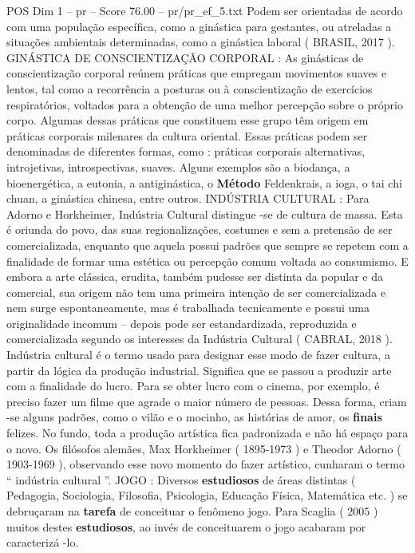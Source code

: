 \begin{textsample}{POS Dim 1 – pr – Score 76.00 – pr/pr\_ef\_5.txt}
Podem ser orientadas de acordo com uma população específica, como a ginástica para gestantes, ou atreladas a situações ambientais determinadas, como a ginástica laboral ( BRASIL, 2017 ).
GINÁSTICA DE CONSCIENTIZAÇÃO CORPORAL : As ginásticas de conscientização corporal reúnem práticas que empregam movimentos suaves e lentos, tal como a recorrência a posturas ou à conscientização de exercícios respiratórios, voltados para a obtenção de uma melhor percepção sobre o próprio corpo.
Algumas dessas práticas que constituem esse grupo têm origem em práticas corporais milenares da cultura oriental.
Essas práticas podem ser denominadas de diferentes formas, como : práticas corporais alternativas, introjetivas, introspectivas, suaves.
Alguns exemplos são a biodança, a bioenergética, a eutonia, a antiginástica, o \textbf{Método} Feldenkrais, a ioga, o tai chi chuan, a ginástica chinesa, entre outros.
INDÚSTRIA CULTURAL : Para Adorno e Horkheimer, Indústria Cultural distingue -se de cultura de massa.
Esta é oriunda do povo, das suas regionalizações, costumes e sem a pretensão de ser comercializada, enquanto que aquela possui padrões que sempre se repetem com a finalidade de formar uma estética ou percepção comum voltada ao consumismo.
E embora a arte clássica, erudita, também pudesse ser distinta da popular e da comercial, sua origem não tem uma primeira intenção de ser comercializada e nem surge espontaneamente, mas é trabalhada tecnicamente e possui uma originalidade incomum – depois pode ser estandardizada, reproduzida e comercializada segundo os interesses da Indústria Cultural ( CABRAL, 2018 ).
Indústria cultural é o termo usado para designar esse modo de fazer cultura, a partir da lógica da produção industrial.
Significa que se passou a produzir arte com a finalidade do lucro.
Para se obter lucro com o cinema, por exemplo, é preciso fazer um filme que agrade o maior número de pessoas.
Dessa forma, criam -se alguns padrões, como o vilão e o mocinho, as histórias de amor, os \textbf{finais} felizes.
No fundo, toda a produção artística fica padronizada e não há espaço para o novo.
Os filósofos alemães, Max Horkheimer ( 1895-1973 ) e Theodor Adorno ( 1903-1969 ), observando esse novo momento do fazer artístico, cunharam o termo “ indústria cultural ”.
JOGO : Diversos \textbf{estudiosos} de áreas distintas ( Pedagogia, Sociologia, Filosofia, Psicologia, Educação Física, Matemática etc. ) se debruçaram na \textbf{tarefa} de conceituar o fenômeno jogo.
Para Scaglia ( 2005 ) muitos destes \textbf{estudiosos}, ao invés de conceituarem o jogo acabaram por caracterizá -lo.

\end{textsample}
